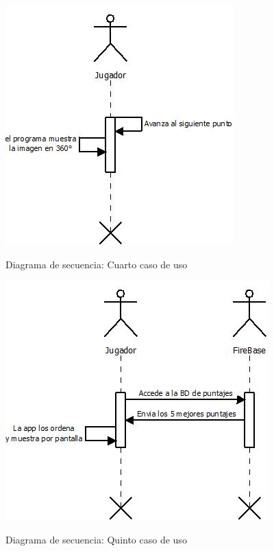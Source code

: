 \begin{figure}[htbp]
\centering
   \includegraphics[scale=0.9]{imgs/DS_4.jpeg}
   \begin{center}
   Diagrama de secuencia: Cuarto caso de uso
   \end{center}
\end{figure}

\begin{figure}[htbp]
\centering
   \includegraphics[scale=0.9]{imgs/DS_5.jpeg}
   \begin{center}
   Diagrama de secuencia: Quinto caso de uso
   \end{center}
\end{figure}

